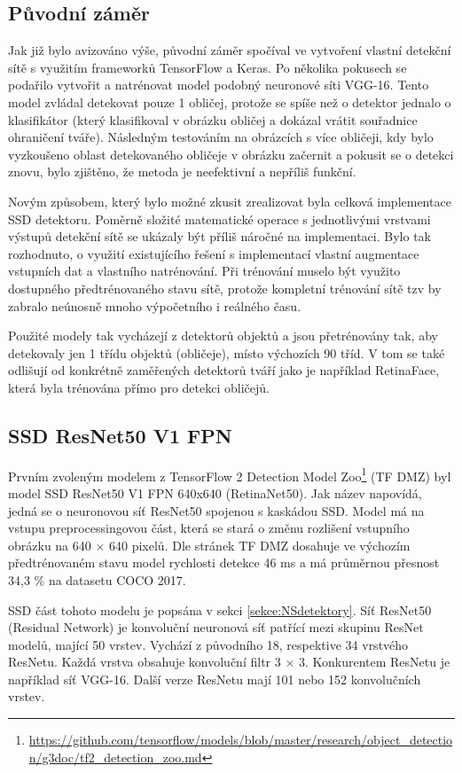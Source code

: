 \subsection*{Původní záměr}
Jak již bylo avizováno výše, původní záměr spočíval ve vytvoření vlastní detekční sítě s využitím frameworků TensorFlow a Keras. Po několika pokusech se podařilo vytvořit a natrénovat model podobný neuronové síti VGG-16. Tento model zvládal detekovat pouze 1 obličej, protože se spíše než o detektor jednalo o klasifikátor (který klasifikoval v obrázku obličej a dokázal vrátit souřadnice ohraničení tváře). Následným testováním na obrázcích s více obličeji, kdy bylo vyzkoušeno oblast detekovaného obličeje v obrázku začernit a pokusit se o detekci znovu, bylo zjištěno, že metoda je neefektivní a nepříliš funkční.

Novým způsobem, který bylo možné zkusit zrealizovat byla celková implementace SSD detektoru. Poměrně složité matematické operace s jednotlivými vrstvami výstupů detekční sítě se ukázaly být příliš náročné na implementaci. Bylo tak rozhodnuto, o využití existujícího řešení s implementací vlastní augmentace vstupních dat a vlastního natrénování. Při trénování muselo být využito dostupného předtrénovaného stavu sítě, protože kompletní trénování sítě tzv  by zabralo neúnosně mnoho výpočetního i reálného času.

Použité modely tak vycházejí z detektorů objektů a jsou přetrénovány tak, aby detekovaly jen 1 třídu objektů (obličeje), místo výchozích 90 tříd. V tom se také odlišují od konkrétně zaměřených detektorů tváří jako je například RetinaFace, která byla trénována přímo pro detekci obličejů.

\subsection*{SSD ResNet50 V1 FPN}
Prvním zvoleným modelem z TensorFlow 2 Detection Model Zoo\footnote{\url{https://github.com/tensorflow/models/blob/master/research/object_detection/g3doc/tf2_detection_zoo.md}} (TF DMZ) byl model SSD ResNet50 V1 FPN 640x640 (RetinaNet50). Jak název napovídá, jedná se o neuronovou síť ResNet50 spojenou s kaskádou SSD. Model má na vstupu preprocessingovou část, která se stará o změnu rozlišení vstupního obrázku na 640 $\times$ 640 pixelů. Dle stránek TF DMZ dosahuje ve výchozím předtrénovaném stavu model rychlosti detekce 46 ms a má průměrnou přesnost 34,3 \% na datasetu COCO 2017.

SSD část tohoto modelu je popsána v sekci \ref{sekce:NSdetektory}. Síť ResNet50 (Residual Network) \cite{resnet} je konvoluční neuronová síť patřící mezi skupinu ResNet modelů, mající 50 vrstev. Vychází z původního 18, respektive 34 vrstvého ResNetu. Každá vrstva obsahuje konvoluční filtr 3 $\times$ 3. Konkurentem ResNetu je například síť VGG-16. Další verze ResNetu mají 101 nebo 152 konvolučních vrstev.

